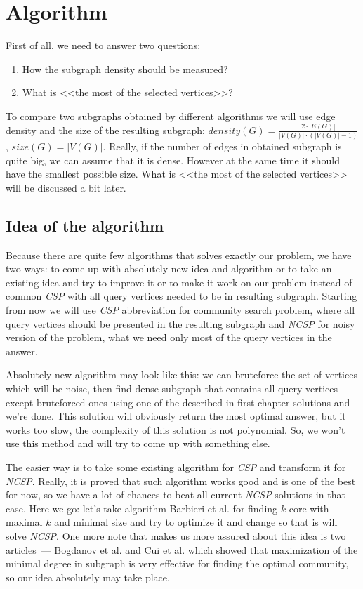 \chapter{Algorithm}

First of all, we need to answer two questions:

\begin{enumerate}
  \item How the subgraph density should be measured?
  \item What is <<the most of the selected vertices>>?
\end{enumerate}

To compare two subgraphs obtained by different algorithms we will use edge density and the size of the resulting subgraph: $density(G) = \frac{2 \cdot |E(G)|}{|V(G)| \cdot (|V(G)| - 1)}$, $size(G) = |V(G)|$. Really, if the number of edges in obtained subgraph is quite big, we can assume that it is dense. However at the same time it should have the smallest possible size. What is <<the most of the selected vertices>> will be discussed a bit later.

\section{Idea of the algorithm}

Because there are quite few algorithms that solves exactly our problem, we have two ways: to come up with absolutely new idea and algorithm or to take an existing idea and try to improve it or to make it work on our problem instead of common \textit{CSP} with all query vertices needed to be in resulting subgraph. Starting from now we will use \textit{CSP} abbreviation for community search problem, where all query vertices should be presented in the resulting subgraph and \textit{NCSP} for noisy version of the problem, what we need only most of the query vertices in the answer.

Absolutely new algorithm may look like this: we can bruteforce the set of vertices which will be noise, then find dense subgraph that contains all query vertices except bruteforced ones using one of the described in first chapter solutions and we're done. This solution will obviously return the most optimal answer, but it works too slow, the complexity of this solution is not polynomial. So, we won't use this method and will try to come up with something else.

The easier way is to take some existing algorithm for \textit{CSP} and transform it for \textit{NCSP}. Really, it is proved that such algorithm works good and is one of the best for now, so we have a lot of chances to beat all current \textit{NCSP} solutions in that case. Here we go: let's take algorithm Barbieri et al. \cite{Barbieri15} for finding $k$-core with maximal $k$ and minimal size and try to optimize it and change so that is will solve \textit{NCSP}. One more note that makes us more assured about this idea is two articles~--- Bogdanov et al. \cite{Bogdanov13} and Cui et al. \cite{Cui14} which showed that maximization of the minimal degree in subgraph is very effective for finding the optimal community, so our idea absolutely may take place.

